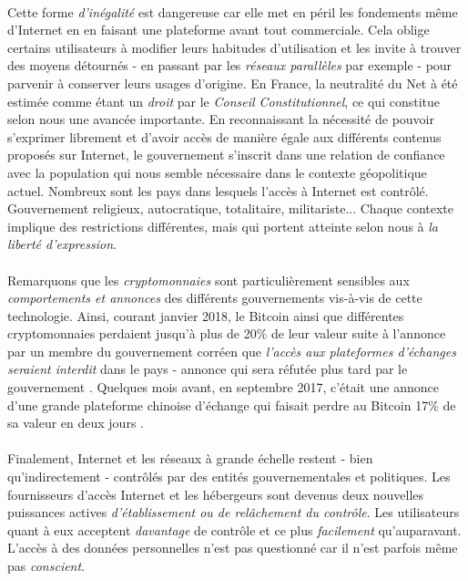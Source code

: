 \paragraph{} Cette forme \emph{d'inégalité} est dangereuse car elle met en péril les fondements même d'Internet
en en faisant une plateforme avant tout commerciale. Cela oblige certains utilisateurs à modifier leurs habitudes 
d'utilisation et les invite à trouver des moyens détournés - en passant par les \emph{réseaux parallèles} par exemple -
pour parvenir à conserver leurs usages d'origine. En France, la neutralité du Net à été estimée comme étant un \emph{droit} 
par le \emph{Conseil Constitutionnel}, ce qui constitue selon nous une avancée importante. En reconnaissant la
nécessité de pouvoir s'exprimer librement et d'avoir accès de manière égale aux différents contenus proposés
sur Internet, le gouvernement s'inscrit dans une relation de confiance avec la population qui nous semble
nécessaire dans le contexte géopolitique actuel. Nombreux sont les pays dans lesquels l'accès à Internet
est contrôlé. Gouvernement religieux, autocratique, totalitaire, militariste... Chaque contexte implique
des restrictions différentes, mais qui portent atteinte selon nous à \emph{la liberté d'expression}.

\paragraph{} Remarquons que les \emph{cryptomonnaies} sont particulièrement sensibles aux \emph{comportements
et annonces} des différents gouvernements vis-à-vis de cette technologie. Ainsi, courant janvier 2018, le Bitcoin
ainsi que différentes cryptomonnaies perdaient jusqu'à plus de 20\% de leur valeur suite à l'annonce par un membre du
gouvernement corréen que \emph{l'accès aux plateformes d'échanges seraient interdit} dans le pays
- annonce qui sera réfutée plus tard par le gouvernement \cite{CryptoMonnaies0}. Quelques mois avant, en septembre 2017, 
c'était une annonce d'une grande plateforme chinoise d'échange qui faisait perdre au Bitcoin 17\% de sa valeur en deux 
jours \cite{CryptoMonnaies1}.

\paragraph{} Finalement, Internet et les réseaux à grande échelle restent - bien qu'indirectement - contrôlés par des 
entités gouvernementales et politiques. Les fournisseurs d'accès Internet et les hébergeurs sont devenus deux 
nouvelles puissances actives \emph{d'établissement ou de relâchement du contrôle}. Les utilisateurs quant à eux
acceptent \emph{davantage} de contrôle et ce plus \emph{facilement} qu'auparavant. L'accès à des données personnelles
n'est pas questionné car il n'est parfois même pas \emph{conscient}.
